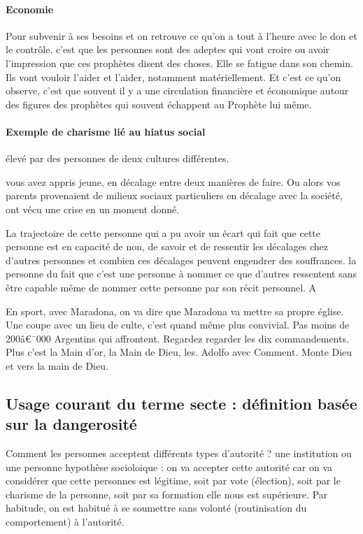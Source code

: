\paragraph{Economie}
Pour subvenir à  ses besoins et on retrouve ce qu'on a tout à  l'heure avec le don et le contrôle.
 c'est que les personnes sont des adeptes qui vont croire ou avoir l'impression que ces prophètes disent des choses.   Elle se fatigue dans son chemin. Ils vont vouloir l'aider et l'aider, notamment matériellement. Et  c'est ce qu'on observe, c'est que souvent il y a une circulation financière et économique autour des figures des prophètes qui souvent échappent au Prophète lui même.
 \paragraph{Exemple de charisme lié au hiatus social}
 \begin{Def}
      élevé par des personnes de deux cultures différentes.
 \end{Def} 
 \begin{Ex}
     vous avez appris jeune, en décalage entre deux manières de faire. Ou alors vos parents provenaient de milieux sociaux particuliers en décalage avec la société, ont vécu une crise en un moment donné.
 \end{Ex}
 La trajectoire de cette personne qui a pu avoir un écart qui fait que cette personne est en capacité de non, de savoir et de ressentir les décalages chez d'autres personnes et combien ces décalages peuvent engendrer des souffrances.
 la personne du fait que c'est une personne à  nommer ce que d'autres ressentent sans être capable même de nommer cette personne par son récit personnel.  
A
\begin{Ex}
  En sport, avec Maradona, on va dire que Maradona va mettre sa propre église. Une coupe avec un lieu de culte, c'est quand même plus convivial. Pas moins de 200â€¯000 Argentins qui affrontent. Regardez regarder les dix commandements. Plus c'est la Main d'or, la Main de Dieu, les.
Adolfo avec Comment.
Monte Dieu et vers la main de Dieu.  
\end{Ex}
 

\subsection{Usage courant du terme secte : définition basée sur la dangerosité}

\begin{Synthesis}
    Comment les personnes acceptent différents types d'autorité ? une institution ou une personne 
    hypothèse socioloique : on va accepter cette autorité car on va considérer que cette personnes est légitime, soit par vote (élection), soit par le charisme de la personne, soit par sa formation elle nous est supérieure.
    Par habitude, on est habitué à se soumettre sans volonté (routinisation du comportement) à l'autorité.
    
\end{Synthesis}

